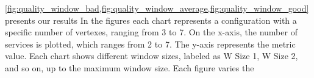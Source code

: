 





\cref{fig:quality_window_bad,fig:quality_window_average,fig:quality_window_good} presents our results
In the figures each chart represents a configuration with a specific number of vertexes, ranging from 3 to 7.
On the x-axis, the number of services is plotted, which ranges from 2 to 7.
The y-axis represents the metric value.
Each chart shows different window sizes, labeled as W Size 1, W Size 2, and so on, up to the maximum window size.
Each figure varies the


